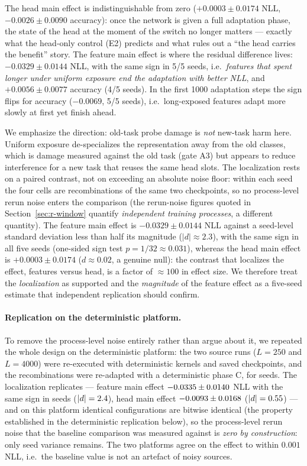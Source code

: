 \documentclass[review,12pt]{elsarticle}
\begin{document}
The head main effect is indistinguishable from zero
($+0.0003\pm0.0174$ NLL, $-0.0026\pm0.0090$ accuracy): once the network is
given a full adaptation phase, the state of the head at the moment of the
switch no longer matters --- exactly what the head-only control (E2) predicts
and what rules out a ``the head carries the benefit'' story.
The feature main effect is where the residual difference lives:
$-0.0329\pm0.0144$ NLL, with the same sign in 5/5 seeds, i.e.\ \emph{features
that spent longer under uniform exposure end the adaptation with better NLL},
and $+0.0056\pm0.0077$ accuracy (4/5 seeds). In the first 1000 adaptation
steps the sign flips for accuracy ($-0.0069$, 5/5 seeds), i.e.\ long-exposed
features adapt more slowly at first yet finish ahead.

We emphasize the direction: old-task probe damage is \emph{not} new-task harm
here. Uniform exposure de-specializes the representation away from the old
classes, which is damage measured against the old task (gate A3) but appears
to reduce interference for a new task that reuses the same head slots. The
localization rests on a paired contrast, not on exceeding an absolute noise
floor: within each seed the four cells are recombinations of the same two
checkpoints, so no process-level rerun noise enters the comparison (the
rerun-noise figures quoted in Section~\ref{sec:r-window} quantify \emph{independent
training processes}, a different quantity). The feature main effect is
$-0.0329\pm0.0144$ NLL against a seed-level standard deviation less than half
its magnitude ($|d|\approx2.3$), with the same sign in all five seeds
(one-sided sign test $p=1/32\approx0.031$), whereas the head main effect is
$+0.0003\pm0.0174$ ($d\approx0.02$, a genuine null): the contrast that
localizes the effect, features versus head, is a factor of $\approx100$ in
effect size. We therefore treat the \emph{localization} as supported and the
\emph{magnitude} of the feature effect as a five-seed estimate that
independent replication should confirm.

\paragraph{Replication on the deterministic platform.}
To remove the process-level noise entirely rather than argue about it, we
repeated the whole design on the deterministic platform: the two source runs
($L{=}250$ and $L{=}4000$) were re-executed with deterministic kernels and
saved checkpoints, and the recombinations were re-adapted with a deterministic
phase C, for \DetTN{} seeds. The localization replicates --- feature main
effect $-0.0335\pm0.0140$ NLL with the same sign in \DetTFeatNeg{}
seeds ($|d|=2.4$), head main effect
$-0.0093\pm0.0168$ ($|d|=0.55$) --- and on this platform
identical configurations are bitwise identical (the property established in
the deterministic replication below), so the process-level rerun noise that
the baseline comparison was measured against is \emph{zero by construction}:
only seed variance remains. The two platforms agree on the effect to within
$0.001$ NLL, i.e.\ the baseline value is not an artefact of noisy sources.
\end{document}
